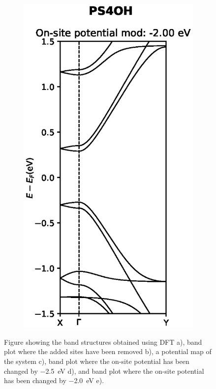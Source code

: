 \begin{figure}[h]
\begin{subfigure}[b]{0.3\textwidth}
		\vspace{-2.5\baselineskip}
		\caption{}
		\label{PS4OHmod1}
	\end{subfigure}
	~
	\begin{subfigure}[b]{0.3\textwidth}
		\centering
		\includegraphics[width=\textwidth]{Figures/PS4OHmod2.eps}
		\vspace{-2.5\baselineskip}
		\caption{}
		\label{PS4OHdevmod2}
	\end{subfigure}
	\caption{Figure showing the band structures obtained using DFT a), band plot where the added sites have been removed b), a potential map of the system c), band plot where the on-site potential has been changed by \SI{-2.5}{\electronvolt} d), and band plot where the on-site potential has been changed by \SI{-2.0}{\electronvolt} e).}
	\label{PS4OH}
\end{figure}

